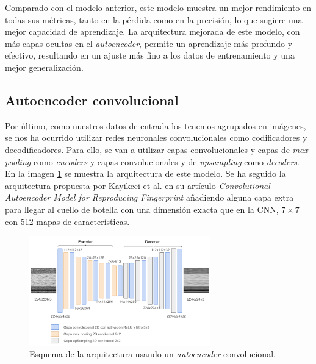 Comparado con el modelo anterior, este modelo muestra un mejor rendimiento en todas sus métricas, tanto en la pérdida como en la precisión, lo que sugiere una mejor capacidad de aprendizaje. La arquitectura mejorada de este modelo, con más capas ocultas en el \textit{autoencoder}, permite un aprendizaje más profundo y efectivo, resultando en un ajuste más fino a los datos de entrenamiento y una mejor generalización.



\subsection{Autoencoder convolucional}

Por último, como nuestros datos de entrada los tenemos agrupados en imágenes, se nos ha ocurrido utilizar redes neuronales convolucionales como codificadores y decodificadores. Para ello, se van a utilizar capas convolucionales y capas de \textit{max pooling} como \textit{encoders} y capas convolucionales y de \textit{upsampling} como \textit{decoders}. En la imagen \ref{img: caeMMC} se muestra la arquitectura de este modelo. Se ha seguido la arquitectura propuesta por Kayikcci et al. \citep{kayikcci2020convolutional} en su artículo \textit{Convolutional Autoencoder Model for Reproducing Fingerprint} añadiendo alguna capa extra para llegar al cuello de botella con una dimensión exacta que en la CNN, $7 \times 7$ con 512 mapas de características.

\begin{figure}[h]
    \begin{center}
    \includegraphics[width=0.7\textwidth]{img/caeMMC.png}
    \end{center}
    \caption{Esquema de la arquitectura usando un \textit{autoencoder} convolucional.}
    \label{img: caeMMC}
\end{figure} 

